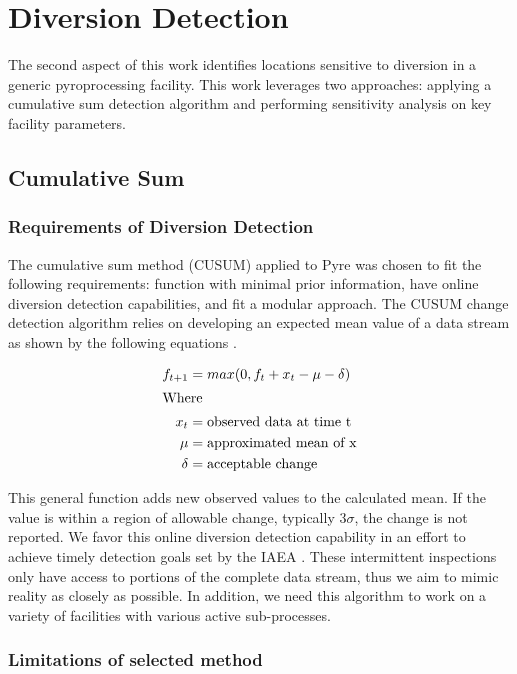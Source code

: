\chapter[Diversion Detection]{Diversion Detection}

The second aspect of this work identifies locations sensitive to diversion in a generic pyroprocessing facility. This work leverages two approaches: applying
a cumulative sum detection algorithm and performing sensitivity analysis on key facility parameters. 
\section{Cumulative Sum}

\subsection{Requirements of Diversion Detection}


The cumulative sum method (CUSUM) applied to Pyre was chosen to fit the following requirements: function with minimal prior information, have online diversion detection
capabilities, and fit a modular approach. The CUSUM change detection algorithm relies on developing an expected mean value of a data stream as shown by the following equations \cite{basseville_detection_1993}.

\begin{align}
	f_{t+1} &= max(0, f_t + x_t - \mu - \delta) \\
	\intertext{Where}
	x_t &= \mbox{observed data at time t} \nonumber \\
	\mu &= \mbox{approximated mean of x} \nonumber \\
	\delta &= \mbox{acceptable change} \nonumber
\end{align}

This general function adds new observed values to the calculated mean. If the value is within a region of allowable change, typically 3$\sigma$, the change is not reported. 
We favor this online diversion detection capability in an effort to achieve timely detection goals set by the IAEA \cite{international_atomic_energy_agency_implications_2004}.
These intermittent inspections only have access to portions of the complete data stream, thus we aim to mimic reality as closely as possible. In addition, we need this
algorithm to work on a variety of facilities with various active sub-processes.

\subsection{Limitations of selected method}

